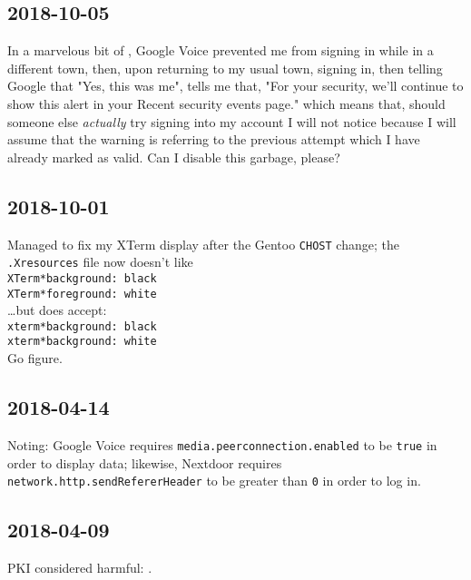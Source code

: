 \documentclass{article}
\begin{document}
\subsection{2018-10-05}
In a marvelous bit of , Google Voice prevented me from signing in while in a different town, then, upon returning to my usual town, signing in, then telling Google that "Yes, this was me", tells me that, "For your security, we'll continue to show this alert in your Recent security events page." which means that, should someone else \emph{actually} try signing into my account I will not notice because I will assume that the warning is referring to the previous attempt which I have already marked as valid.  Can I disable this garbage, please?

\subsection{2018-10-01}
Managed to fix my XTerm display after the Gentoo \texttt{CHOST} change; the \texttt{.Xresources} file now doesn't like \\
    \texttt{XTerm*background: black} \\
    \texttt{XTerm*foreground: white} \\
\ldots but does accept: \\
    \texttt{xterm*background: black} \\
    \texttt{xterm*background: white} \\
Go figure.

\subsection{2018-04-14}
Noting: Google Voice requires \texttt{media.peerconnection.enabled} to be \texttt{true} in order to display data; likewise, Nextdoor requires \texttt{network.http.sendRefererHeader} to be greater than \texttt{0} in order to log in.

\subsection{2018-04-09}
PKI considered harmful: .
\end{document}
